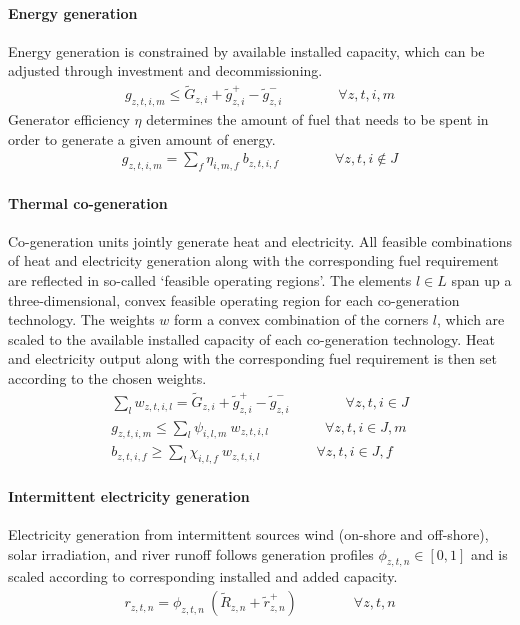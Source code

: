 \documentclass[11pt,a4paper]{article}
\begin{document}
\paragraph{Energy generation}
Energy generation is constrained by available installed capacity, which can be adjusted through investment and decommissioning.
\begin{align}
g_{z,t,i,m} \leq \widetilde{G}_{z,i} + \widetilde{g}^{+}_{z,i} - \widetilde{g}^{-}_{z,i} \qquad \qquad \forall z,t,i,m
\end{align}
Generator efficiency $\eta$ determines the amount of fuel that needs to be spent in order to generate a given amount of energy.
\begin{align}
g_{z,t,i,m} = \sum_{f} \eta_{i,m,f} \: b_{z,t,i,f} \qquad \qquad \forall z,t,i \notin J
\end{align}

\paragraph{Thermal co-generation}
Co-generation units jointly generate heat and electricity. All feasible combinations of heat and electricity generation along with the corresponding fuel requirement are reflected in so-called `feasible operating regions'. 
The elements $l \in L$ span up a three-dimensional, convex feasible operating region for each co-generation technology. 
The weights $w$ form a convex combination of the corners $l$, which are scaled to the available installed capacity of each co-generation technology.
Heat and electricity output along with the corresponding fuel requirement is then set according to the chosen weights.
\begin{align}
\sum_{l} w_{z,t,i,l} = \widetilde{G}_{z,i} + \widetilde{g}^{+}_{z,i} - \widetilde{g}^{-}_{z,i} \qquad \qquad \forall z,t,i \in J \\
g_{z,t,i,m} \leq \sum_{l} \psi_{i,l,m} \: w_{z,t,i,l} \qquad \qquad \forall z,t,i \in J, m \\
b_{z,t,i,f} \geq \sum_{l} \chi_{i,l,f} \: w_{z,t,i,l} \qquad \qquad \forall z,t,i \in J, f
\end{align}

\paragraph{Intermittent electricity generation}
Electricity generation from intermittent sources wind (on-shore and off-shore), solar irradiation, and river runoff follows generation profiles $\phi_{z,t,n} \in [0,1]$ and is scaled according to corresponding installed and added capacity.
\begin{align}
r_{z,t,n} = \phi_{z,t,n} \: \left( \widetilde{R}_{z,n} + \widetilde{r}^{+}_{z,n} \right) \qquad \qquad \forall z,t,n
\end{align}
\end{document}

